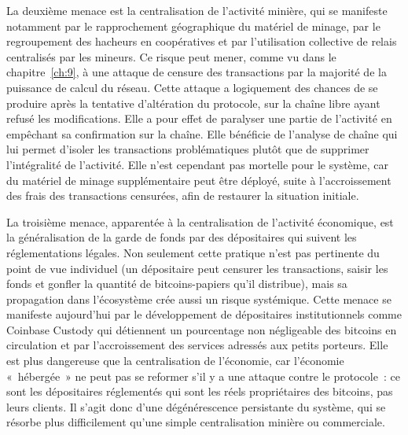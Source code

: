 La deuxième menace est la centralisation de l'activité minière, qui se manifeste notamment par le rapprochement géographique du matériel de minage, par le regroupement des hacheurs en coopératives et par l'utilisation collective de relais centralisés par les mineurs. Ce risque peut mener, comme vu dans le chapitre~\ref{ch:9}, à une attaque de censure des transactions par la majorité de la puissance de calcul du réseau. Cette attaque a logiquement des chances de se produire après la tentative d'altération du protocole, sur la chaîne libre ayant refusé les modifications. Elle a pour effet de paralyser une partie de l'activité en empêchant sa confirmation sur la chaîne. Elle bénéficie de l'analyse de chaîne qui lui permet d'isoler les transactions problématiques plutôt que de supprimer l'intégralité de l'activité. Elle n'est cependant pas mortelle pour le système, car du matériel de minage supplémentaire peut être déployé, suite à l'accroissement des frais des transactions censurées, afin de restaurer la situation initiale. %

La troisième menace, apparentée à la centralisation de l'activité économique, est la généralisation de la garde de fonds par des dépositaires qui suivent les réglementations légales. Non seulement cette pratique n'est pas pertinente du point de vue individuel (un dépositaire peut censurer les transactions, saisir les fonds et gonfler la quantité de bitcoins-papiers qu'il distribue), mais sa propagation dans l'écosystème crée aussi un risque systémique. Cette menace se manifeste aujourd'hui par le développement de dépositaires institutionnels comme Coinbase Custody qui détiennent un pourcentage non négligeable des bitcoins en circulation et par l'accroissement des services adressés aux petits porteurs. Elle est plus dangereuse que la centralisation de l'économie, car l'économie «~hébergée~» ne peut pas se reformer s'il y a une attaque contre le protocole~: ce sont les dépositaires réglementés qui sont les réels propriétaires des bitcoins, pas leurs clients. Il s'agit donc d'une dégénérescence persistante du système, qui se résorbe plus difficilement qu'une simple centralisation minière ou commerciale.

